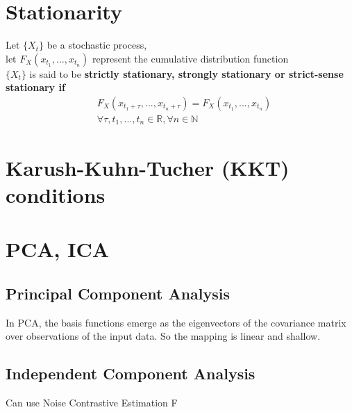 \documentclass[../main.tex]{subfiles}
\begin{document}
\section{Stationarity}
Let $\{ X_t \}$ be a stochastic process, \\
let $F_X(x_{t_1}, ..., x_{t_n})$ represent the cumulative distribution function \\
$\{ X_t \}$ is said to be \textbf{strictly stationary, strongly stationary or strict-sense stationary if}
\begin{align*}
    &F_X(x_{t_1+\tau}, ..., x_{t_n+\tau}) = F_X(x_{t_1}, ..., x_{t_n}) \\
    &\forall \tau, t_1, ..., t_n \in \mathbb{R}, \forall n \in \mathbb{N}
\end{align*}

\section{Karush-Kuhn-Tucher (KKT) conditions}


\section{PCA, ICA}
\subsection{Principal Component Analysis}
In PCA, the basis functions emerge as the eigenvectors of the covariance matrix over observations of
the input data. So the mapping is linear and shallow.

\subsection{Independent Component Analysis}
Can use Noise Contrastive Estimation
F
\end{document}
